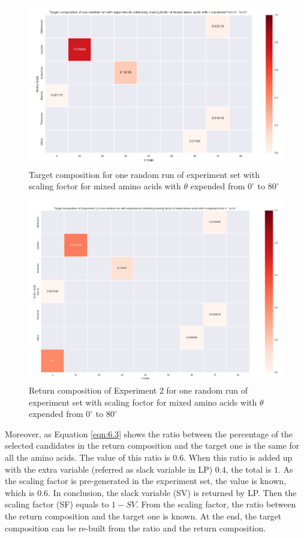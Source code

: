\begin{figure}[!ht] 
\centering
\includegraphics[scale=0.5]{Figures/chapter6_figure_one.png}
\caption{Target composition for one random run of experiment set with scaling foctor for mixed amino acids with $\theta$ expended from $0^{\circ}$ to $80^{\circ}$} \label{fig:6.1}
\end{figure}


\begin{figure}[!ht] 
\centering
\includegraphics[scale=0.4]{Figures/chapter6_figure_two.png}
\caption{Return composition of Experiment 2 for one random run of experiment set with scaling foctor for mixed amino acids with $\theta$ expended from $0^{\circ}$ to $80^{\circ}$} \label{fig:6.2}
\end{figure}

Moreover, as Equation \ref{eqn:6.3} shows the ratio between the percentage of the selected candidates in the return composition and the target one is the same for all the amino acids. The value of this ratio is $0.6$. When this ratio is added up with the extra variable (referred as slack variable in LP) $0.4$, the total is $1$. As the scaling factor is pre-generated in the experiment set, the value is known, which is $0.6$. In conclusion, the slack variable (SV) is returned by LP. Then the scaling factor (SF) equals to $1 - SV$. From the scaling factor, the ratio between the return composition and the target one is known. At the end, the target composition can be re-built from the ratio and the return composition.\\

